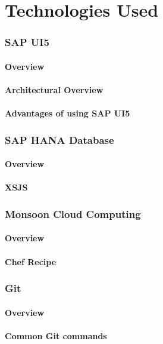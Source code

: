 \documentclass[a4paper, 12pt,oneside]{article}
\begin{document}
\part{Technologies Used}
\section{SAP UI5}
\subsection{Overview}
\subsection{Architectural Overview}
\subsection{Advantages of using SAP UI5}

\section{SAP HANA Database}
\subsection{Overview}
\subsection{XSJS}

\section{Monsoon Cloud Computing}
\subsection{Overview}
\subsection{Chef Recipe}

\section{Git}
\subsection{Overview}
\subsection{Common Git commands}
\end{document}
